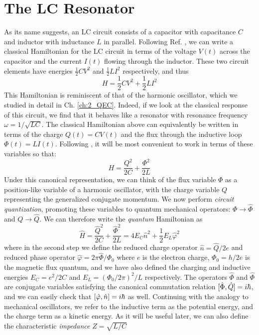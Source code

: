 \section{The LC Resonator}

As its name suggests, an LC circuit consists of a capacitor with capacitance $C$ and inductor with inductance $L$ in parallel. Following Ref. \cite{krantz2019quantum}, we can write a classical Hamiltonian for the LC circuit in terms of the voltage $V(t)$ across the capacitor and the current $I(t)$ flowing through the inductor. These two circuit elements have energies $\frac{1}{2}CV^2$ and $\frac{1}{2}LI^2$ respectively, and thus
\begin{equation}
    H = \frac{1}{2}CV^2 + \frac{1}{2}LI^2
\end{equation}
This Hamiltonian is reminiscent of that of the harmonic oscillator, which we studied in detail in Ch. \ref{ch:2_QEC}. Indeed, if we look at the classical response of this circuit, we find that it behaves like a resonator with resonance frequency $\omega = 1/\sqrt{LC}$. The classical Hamiltonian above can equivalently be written in terms of the charge $Q(t) = CV(t)$ and the flux through the inductive loop $\Phi(t) = LI(t)$. Following \cite{devoret1995quantum}, it will be most convenient to work in terms of these variables so that:
\begin{equation}
    H = \frac{Q^2}{2C} + \frac{\Phi^2}{2L}
\end{equation}
Under this canonical representation, we can think of the flux variable $\Phi$ as a position-like variable of a harmonic oscillator, with the charge variable $Q$ representing the generalized conjugate momentum. We now perform \textit{circuit quantization}, promoting these variables to quantum mechanical operators: $\Phi \to \hat{\Phi}$ and $Q \to \hat{Q}$. We can therefore write the \textit{quantum} Hamiltonian as
\begin{equation}
    \hat{H} = \frac{\hat{Q}^2}{2C} + \frac{\hat{\Phi}^2}{2L} = 4E_C \hat{n}^2 + \frac{1}{2}E_L \hat{\varphi}^2
\end{equation}
where in the second step we define the reduced charge operator $\hat{n} = \hat{Q}/2e$ and reduced phase operator $\hat{\varphi} = 2\pi \hat{\Phi}/\Phi_0$ where $e$ is the electron charge, $\Phi_0 = h/2e$ is the magnetic flux quantum, and we have also defined the charging and inductive energies $E_C = e^2/2C$ and $E_L = (\Phi_0/2\pi)^2/L$ respectively. The operators $\hat{\Phi}$ and $\hat{\Phi}$ are conjugate variables satisfying the canonical commutation relation $[\hat{\Phi}, \hat{Q}] = i\hbar$, and we can easily check that $[\hat{\varphi}, \hat{n}] = i\hbar$ as well. Continuing with the analogy to mechanical oscillators, we refer to the inductive term as the potential energy, and the charge term as a kinetic energy. As it will be useful later, we can also define the characteristic \textit{impedance} $Z = \sqrt{L/C}$

